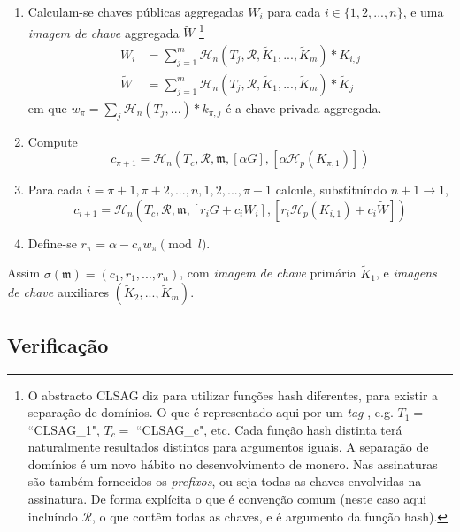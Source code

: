 \begin{description}
\begin{enumerate}
    \item Calculam-se chaves públicas aggregadas $W_i$ para cada \(i \in \{1, 2, ..., n\}\), e uma {\em imagem de chave} aggregada $\tilde{W}$ \footnote{O abstracto CLSAG diz para utilizar funções hash diferentes, para existir a separação de domínios. O que é representado aqui por um {\em tag} \cite{MRL-0011-CLSAG}, e.g. $T_1 =$ ``CLSAG\_1", $T_c =$ ``CLSAG\_c", etc. Cada função hash distinta terá naturalmente resultados distintos para argumentos iguais. A separação de domínios é um novo hábito no desenvolvimento de monero. Nas assinaturas são também fornecidos os {\em prefixos}, ou seja todas as chaves envolvidas na assinatura. De forma explícita o que é convenção comum (neste caso aqui incluíndo $\mathcal{R}$, o que contêm todas as chaves, e é argumento da função hash).}%
    \begin{align*}
    W_i &= \sum^{m}_{j=1} \mathcal{H}_n(T_j, \mathcal{R}, \tilde{K}_1,...,\tilde{K}_{m})*K_{i,j}\\
    \tilde{W} &= \sum^{m}_{j=1} \mathcal{H}_n(T_j, \mathcal{R}, \tilde{K}_1,...,\tilde{K}_{m})*\tilde{K}_j
    \end{align*}{}
    em que $w_{\pi} = \sum_j \mathcal{H}_n(T_j,...)*k_{\pi,j}$ é a chave privada aggregada.

	\item Compute
	\[c_{\pi+1} = \mathcal{H}_n(T_c, \mathcal{R}, \mathfrak{m}, [\alpha G], [\alpha \mathcal{H}_p(K_{\pi, 1})])\]

	\item Para cada \(i = \pi+1, \pi+2, ..., n, 1, 2, ..., \pi-1\) calcule, substituíndo \(n + 1 \rightarrow 1\),\vspace{.175cm}
	\[c_{i+1} = \mathcal{H}_n(T_c, \mathcal{R}, \mathfrak{m}, [r_i G + c_i W_i], [r_{i} \mathcal{H}_p(K_{i,1}) + c_i \tilde{W}])\]

	\item Define-se \(r_{\pi} = \alpha - c_\pi w_\pi \pmod l\).
\end{enumerate}

Assim \(\sigma(\mathfrak{m}) = (c_1, r_1, ..., r_n) \), com {\em imagem de chave} primária $\tilde{K}_1$, e {\em imagens de chave} auxiliares $(\tilde{K}_2,...,\tilde{K}_{m})$.


\subsection*{Verificação}


\end{description}
